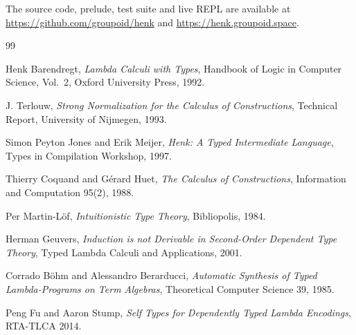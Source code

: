 \documentclass{article}
\begin{document}
The source code, prelude, test suite and live REPL are available at \url{https://github.com/groupoid/henk} and \url{https://henk.groupoid.space}.

\begin{thebibliography}{99}

Henk Barendregt,
\textit{Lambda Calculi with Types},
Handbook of Logic in Computer Science, Vol.~2, Oxford University Press, 1992.

J. Terlouw,
\textit{Strong Normalization for the Calculus of Constructions},
Technical Report, University of Nijmegen, 1993.

Simon Peyton Jones and Erik Meijer,
\textit{Henk: A Typed Intermediate Language},
Types in Compilation Workshop, 1997.

Thierry Coquand and Gérard Huet,
\textit{The Calculus of Constructions},
Information and Computation 95(2), 1988.

Per Martin-Löf,
\textit{Intuitionistic Type Theory},
Bibliopolis, 1984.

Herman Geuvers,
\textit{Induction is not Derivable in Second-Order Dependent Type Theory},
Typed Lambda Calculi and Applications, 2001.

Corrado Böhm and Alessandro Berarducci,
\textit{Automatic Synthesis of Typed Lambda-Programs on Term Algebras},
Theoretical Computer Science 39, 1985.

Peng Fu and Aaron Stump,
\textit{Self Types for Dependently Typed Lambda Encodings},
RTA-TLCA 2014.

\end{thebibliography}
\end{document}
